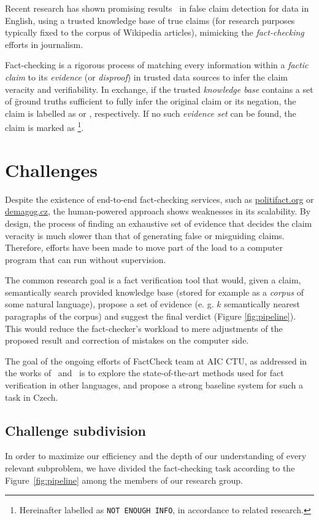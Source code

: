 Recent research has shown promising results~\cite{fever2} in false claim detection for data in English, using a trusted knowledge base of true claims (for research purposes typically fixed to the corpus of \textsf{Wikipedia} articles), mimicking the \textit{fact-checking} efforts in journalism.

Fact-checking is a rigorous process of matching every information within a \textit{factic claim} to its \textit{evidence} (or \textit{disproof}) in trusted data sources to infer the claim veracity and verifiability. In exchange, if the trusted \textit{knowledge base} contains a set of \"{ground truths} sufficient to fully infer the original claim or its negation, the claim is labelled as {} or {}, respectively. If no such \textit{evidence set} can be found, the claim is marked as {}\footnote{Hereinafter labelled as \texttt{NOT ENOUGH INFO}, in accordance to related research.}.


\section{Challenges}
Despite the existence of end-to-end fact-checking services, such as \url{politifact.org} or \url{demagog.cz}, the human-powered approach shows weaknesses in its scalability. By design, the process of finding an exhaustive set of evidence that decides the claim veracity is much slower than that of generating false or misguiding claims. Therefore, efforts have been made to move part of the load to a computer program that can run without supervision.

The common research goal is a fact verification tool that would, given a claim, semantically search provided knowledge base (stored for example as a \textit{corpus} of some natural language), propose a set of evidence (e. g. $k$ semantically nearest paragraphs of the corpus) and suggest the final verdict (Figure \ref{fig:pipeline}). This would reduce the fact-checker's workload to mere adjustments of the proposed result and correction of mistakes on the computer side. 

The goal of the ongoing efforts of {\textsf{FactCheck}} team at {\textsf{AIC CTU}}, as addressed in the works of~\cite{rypar,dedkova} and~\cite{gazo} is to explore the state-of-the-art methods used for fact verification in other languages, and propose a strong baseline system for such a task in Czech.

\subsection{Challenge subdivision}
\label{sec:subdivision}
In order to maximize our efficiency and the depth of our understanding of every relevant subproblem, we have divided the fact-checking task according to the Figure~\ref{fig:pipeline} among the members of our research group. 

